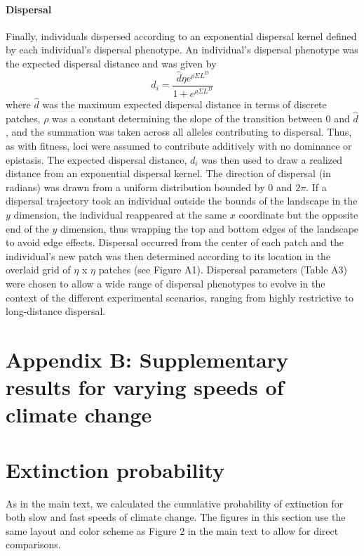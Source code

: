 \documentclass[11pt]{article}
\begin{document}
\paragraph{Dispersal}
Finally, individuals dispersed according to an exponential dispersal kernel defined by each individual's dispersal phenotype. An individual's dispersal phenotype was the expected dispersal distance and was given by
\begin{equation}
d_{i} = \frac{\hat{d}\eta e^{\rho\Sigma L^{D}}}{1+e^{\rho\Sigma L^{D}}} 
\end{equation}
where $\hat{d}$ was the maximum expected dispersal distance in terms of discrete patches, $\rho$ was a constant determining the slope of the transition between $0$ and $\hat{d}$, and the summation was taken across all alleles contributing to dispersal. Thus, as with fitness, loci were assumed to contribute additively with no dominance or epistasis. The expected dispersal distance, $d_{i}$ was then used to draw a realized distance from an exponential dispersal kernel. The direction of dispersal (in radians) was drawn from a uniform distribution bounded by $0$ and $2\pi$. If a dispersal trajectory took an individual outside the bounds of the landscape in the $y$ dimension, the individual reappeared at the same $x$ coordinate but the opposite end of the $y$ dimension, thus wrapping the top and bottom edges of the landscape to avoid edge effects. Dispersal occurred from the center of each patch and the individual's new patch was then determined according to its location in the overlaid grid of $\eta$ x $\eta$ patches (see Figure A1). Dispersal parameters (Table A3) were chosen to allow a wide range of dispersal phenotypes to evolve in the context of the different experimental scenarios, ranging from highly restrictive to long-distance dispersal.

\newpage{}

\section*{Appendix B: Supplementary results for varying speeds of climate change}

\renewcommand{\theequation}{B\arabic{equation}}
\renewcommand{\thetable}{B\arabic{table}}
\setcounter{equation}{0}  %
\setcounter{figure}{0}
\setcounter{table}{0}

\section*{Extinction probability}
As in the main text, we calculated the cumulative probability of extinction for both slow and fast speeds of climate change. The figures in this section use the same layout and color scheme as Figure 2 in the main text to allow for direct comparisons.
\end{document}
